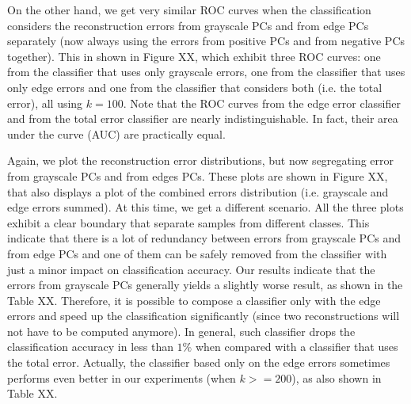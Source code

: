 \documentclass[10pt, conference, compsocconf]{IEEEtran}
\begin{document}

On the other hand, we get very similar ROC curves when the classification considers the reconstruction errors from grayscale PCs and from edge PCs separately (now always using the errors from positive PCs and from negative PCs together). This in shown in Figure XX, which exhibit three ROC curves: one from the classifier that uses only grayscale errors, one from the classifier that uses only edge errors and one from the classifier that considers both (i.e. the total error), all using $k = 100$. Note that the ROC curves from the edge error classifier and from the total error classifier are nearly indistinguishable. In fact, their area under the curve (AUC) are practically equal.


Again, we plot the reconstruction error distributions, but now segregating error from grayscale PCs and from edges PCs. These plots are shown in Figure XX, that also displays a plot of the combined errors distribution (i.e. grayscale and edge errors summed). At this time, we get a different scenario. All the three plots exhibit a clear boundary that separate samples from different classes. This indicate that there is a lot of redundancy between errors from grayscale PCs and from edge PCs and one of them can be safely removed from the classifier with just a minor impact on classification accuracy. Our results indicate that the errors from grayscale PCs generally yields a slightly worse result, as shown in the Table XX. Therefore, it is possible to compose a classifier only with the edge errors and speed up the classification significantly (since two reconstructions will not have to be computed anymore). In general, such classifier drops the classification accuracy in less than $1\%$ when compared with a classifier that uses the total error. Actually, the classifier based only on the edge errors sometimes performs even better in our experiments (when $k >= 200$), as also shown in Table XX.

\end{document}
